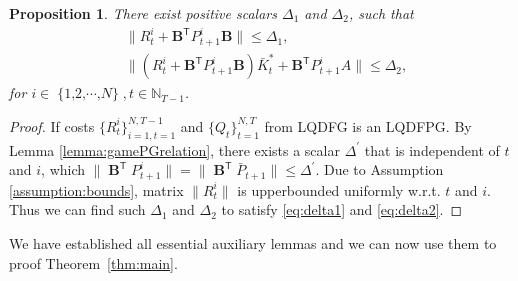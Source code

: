 \documentclass[letterpaper, 10 pt, conference]{ieeeconf}  %
\newcommand{\transpose}{\mathsf{T}}
\DeclareMathOperator{\contB}{\mathbf{B}}
\DeclareMathOperator{\Nplayers}{\{1,2,\cdots,\textit{N}\}}
\newtheorem{proposition}{Proposition}
\begin{document}
\begin{proposition}\label{corollary:Delta}
    There exist positive scalars $\Delta_{1}$ and $\Delta_{2}$, such that
    \begin{align}
    \label{eq:delta1}
        &\|R_{t}^{i}+\mathbf{B}^{\transpose}P_{t+1}^{i}\mathbf{B}\| \leq \Delta_{1},\\
        \label{eq:delta2}
        &\|(R_{t}^{i}+\mathbf{B}^{\transpose}P_{t+1}^{i}\mathbf{B})\bar{K}_{t}^{*}+\mathbf{B}^{\transpose}P_{t+1}^{i}A\| \leq \Delta_{2},
    \end{align}
    for $i \in \Nplayers, t\in \mathbb{N}_{T-1}$.
\end{proposition}
\begin{proof}
    If costs $\{R_{t}^{i}\}_{i=1,t=1}^{N,T-1}$ and $\{Q_{t}\}_{t=1}^{N,T}$ from LQDFG is an LQDFPG. By Lemma \ref{lemma:gamePGrelation}, there exists a scalar $\Delta^{'}$ that is independent of $t$ and $i$, which $
        \|\contB^{\transpose}P_{t+1}^{i}\| = \|\contB^{\transpose}\bar{P}_{t+1}\| \leq \Delta^{'}$. 
    Due to Assumption \ref{assumption:bounds}, matrix $\|R_{t}^{i}\|$ is upperbounded uniformly w.r.t. $t$ and $i$. Thus we can find such $\Delta_{1}$ and $\Delta_{2}$ to satisfy  \eqref{eq:delta1} and \eqref{eq:delta2}.
\end{proof}
We have established all essential auxiliary lemmas and we can now use them to proof Theorem~\ref{thm:main}.
\end{document}
